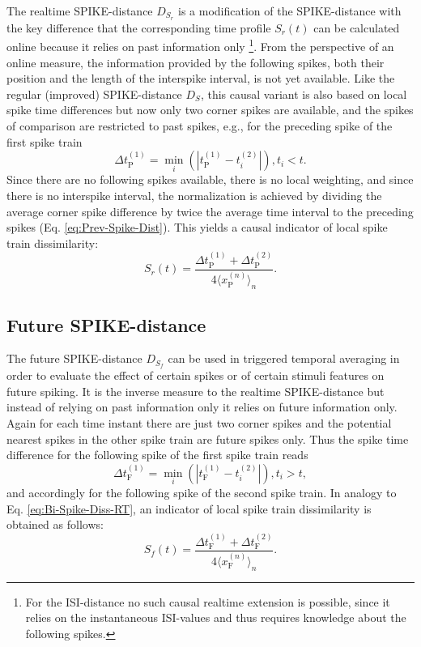 \documentclass[10pt,twocolumn]{elsart5p}
\begin{document}
The realtime SPIKE-distance $D_{S_r}$ is a modification of the SPIKE-distance with the key difference that the corresponding time profile $S_r(t)$ can be calculated online because it relies on past information only \footnote{For the ISI-distance no such causal realtime extension is possible, since it relies on the instantaneous ISI-values and thus requires knowledge about the following spikes.}. From the perspective of an online measure, the information provided by the following spikes, both their position and the length of the interspike interval, is not yet available. Like the regular (improved) SPIKE-distance $D_S$, this causal variant is also based on local spike time differences but now only two corner spikes are available, and the spikes of comparison are restricted to past spikes, e.g., for the preceding spike of the first spike train
%
\begin{equation} \label{eq:Delta-Corner-Spike-Realtime}
     \Delta t_{\mathrm {P}}^{(1)} = \min_i (| t_{\mathrm {P}}^{(1)} - t_i^{(2)} |), t_i < t.
\end{equation}
%
Since there are no following spikes available, there is no local weighting, and since there is no interspike interval, the normalization is achieved by dividing the average corner spike difference by twice the average time interval to the preceding spikes (Eq. \ref{eq:Prev-Spike-Dist}). This yields a causal indicator of local spike train dissimilarity:
%
\begin{equation} \label{eq:Bi-Spike-Diss-RT}
    S_r (t) = \frac{ \Delta t_{\mathrm {P}}^{(1)} + \Delta t_{\mathrm {P}}^{(2)}} {4 \langle x_{\mathrm {P}}^{(n)} \rangle_n}.
\end{equation}


\subsection{\label{ss:Future-Spike-Distance} Future SPIKE-distance}

The future SPIKE-distance $D_{S_f}$ can be used in triggered temporal averaging in order to evaluate the effect of certain spikes or of certain stimuli features on future spiking. It is the inverse measure to the realtime SPIKE-distance but instead of relying on past information only it relies on future information only. Again for each time instant there are just two corner spikes and the potential nearest spikes in the other spike train are future spikes only. Thus the spike time difference for the following spike of the first spike train reads
%
\begin{equation} \label{eq:Delta-Corner-Spike-Future}
     \Delta t_{\mathrm {F}}^{(1)} = \min_i (| t_{\mathrm {F}}^{(1)} - t_i^{(2)} |), t_i > t,
\end{equation}
%
and accordingly for the following spike of the second spike train. In analogy to Eq. \ref{eq:Bi-Spike-Diss-RT}, an indicator of local spike train dissimilarity is obtained as follows:
%
\begin{equation} \label{eq:Bi-Spike-Diss-FT}
    S_f (t) = \frac{ \Delta t_{\mathrm {F}}^{(1)} + \Delta t_{\mathrm {F}}^{(2)}} {4 \langle x_{\mathrm {F}}^{(n)} \rangle_n}.
\end{equation}	
\end{document}
